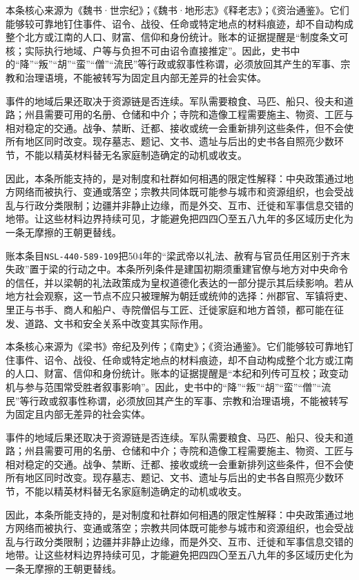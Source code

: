 本条核心来源为《魏书·世宗纪》；《魏书·地形志》《释老志》；《资治通鉴》。它们能够较可靠地钉住事件、诏令、战役、任命或特定地点的材料痕迹，却不自动构成整个北方或江南的人口、财富、信仰和身份统计。账本的证据提醒是“制度条文可核；实际执行地域、户等与负担不可由诏令直接推定”。因此，史书中的“降”“叛”“胡”“蛮”“僧”“流民”等行政或叙事性称谓，必须放回其产生的军事、宗教和治理语境，不能被转写为固定且内部无差异的社会实体。

事件的地域后果还取决于资源链是否连续。军队需要粮食、马匹、船只、役夫和道路；州县需要可用的名册、仓储和中介；寺院和造像工程需要施主、物资、工匠与相对稳定的交通。战争、禁断、迁都、接收或统一会重新排列这些条件，但不会使所有地区同时改变。现存墓志、题记、文书、遗址与后出的史书各自照亮少数环节，不能以精英材料替无名家庭制造确定的动机或收支。

因此，本条所能支持的，是对制度和社群如何相遇的限定性解释：中央政策通过地方网络而被执行、变通或落空；宗教共同体既可能参与城市和资源组织，也会受战乱与行政分类限制；边疆并非静止边缘，而是外交、互市、迁徙和军事信息交错的地带。让这些材料边界持续可见，才能避免把四四〇至五八九年的多区域历史化为一条无摩擦的王朝更替线。

账本条目\texttt{NSL-440-589-109}把504年的“梁武帝以礼法、赦宥与官员任用区别于齐末失政”置于梁的行动之中。本条所列条件是建国初期须重建官僚与地方对中央命令的信任，并以梁朝的礼法政策成为皇权道德化表达的一部分提示其后续影响。若从地方社会观察，这一节点不应只被理解为朝廷或统帅的选择：州郡官、军镇将吏、里正与书手、商人和船户、寺院僧侣与工匠、迁徙家庭和地方首领，都可能在征发、道路、文书和安全关系中改变其实际作用。

本条核心来源为《梁书》帝纪及列传；《南史》；《资治通鉴》。它们能够较可靠地钉住事件、诏令、战役、任命或特定地点的材料痕迹，却不自动构成整个北方或江南的人口、财富、信仰和身份统计。账本的证据提醒是“本纪和列传可互校；政变动机与参与范围常受胜者叙事影响”。因此，史书中的“降”“叛”“胡”“蛮”“僧”“流民”等行政或叙事性称谓，必须放回其产生的军事、宗教和治理语境，不能被转写为固定且内部无差异的社会实体。

事件的地域后果还取决于资源链是否连续。军队需要粮食、马匹、船只、役夫和道路；州县需要可用的名册、仓储和中介；寺院和造像工程需要施主、物资、工匠与相对稳定的交通。战争、禁断、迁都、接收或统一会重新排列这些条件，但不会使所有地区同时改变。现存墓志、题记、文书、遗址与后出的史书各自照亮少数环节，不能以精英材料替无名家庭制造确定的动机或收支。

因此，本条所能支持的，是对制度和社群如何相遇的限定性解释：中央政策通过地方网络而被执行、变通或落空；宗教共同体既可能参与城市和资源组织，也会受战乱与行政分类限制；边疆并非静止边缘，而是外交、互市、迁徙和军事信息交错的地带。让这些材料边界持续可见，才能避免把四四〇至五八九年的多区域历史化为一条无摩擦的王朝更替线。


